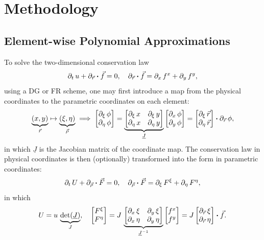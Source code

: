 \documentclass[10pt]{article}
\begin{document}
\section{Methodology}
\subsection{Element-wise Polynomial Approximations}
To solve the two-dimensional conservation law
$$
\partial_{t}\,u+\partial_{\vec{r}}\vdot\vec{f}=0,\quad\partial_{\vec{r}}\vdot\vec{f}=\partial_{x}\,f^{x}+\partial_{y}\,f^{y},
$$
using a DG or FR scheme, one may first introduce a map from the physical coordinates to the parametric coordinates on each element:
$$
\underbrace{(x,y)}_{\vec{r}}\mapsto\underbrace{(\xi,\eta)}_{\vec{\rho}}
\implies
\begin{bmatrix}\partial_{\xi}\,\phi\\
\partial_{\eta}\,\phi
\end{bmatrix}=\underbrace{\begin{bmatrix}\partial_{\xi}\,x & \partial_{\xi}\,y\\
\partial_{\eta}\,x & \partial_{\eta}\,y
\end{bmatrix}}_{\underline{J}}\begin{bmatrix}\partial_{x}\,\phi\\
\partial_{y}\,\phi
\end{bmatrix}=\begin{bmatrix}\partial_{\xi}\,\vec{r}\\
\partial_{\eta}\,\vec{r}
\end{bmatrix}\vdot\partial_{\vec{r}}\,\phi,
$$
in which $\underline{J}$ is the Jacobian matrix of the coordinate map.
%
The conservation law in physical coordinates is then (optionally) transformed into the form in parametric coordinates:
$$
\partial_{t}\,U+\partial_{\vec{\rho}}\vdot\vec{F}=0,\quad\partial_{\vec{\rho}}\vdot\vec{F}=\partial_{\xi}\,F^{\xi}+\partial_{\eta}\,F^{\eta},
$$
in which
$$
U=u\,\underbrace{\det(\underline{J})}_{J},\quad\begin{bmatrix}F^{\xi}\\
F^{\eta}
\end{bmatrix}=J\,\underbrace{\begin{bmatrix}\partial_{x}\,\xi & \partial_{y}\,\xi\\
\partial_{x}\,\eta & \partial_{y}\,\eta
\end{bmatrix}}_{\underline{J}^{-1}}\begin{bmatrix}f^{x}\\
f^{y}
\end{bmatrix}=J\begin{bmatrix}\partial_{\vec{r}}\,\xi\\
\partial_{\vec{r}}\,\eta
\end{bmatrix}\vdot\vec{f}.
$$
\end{document}
